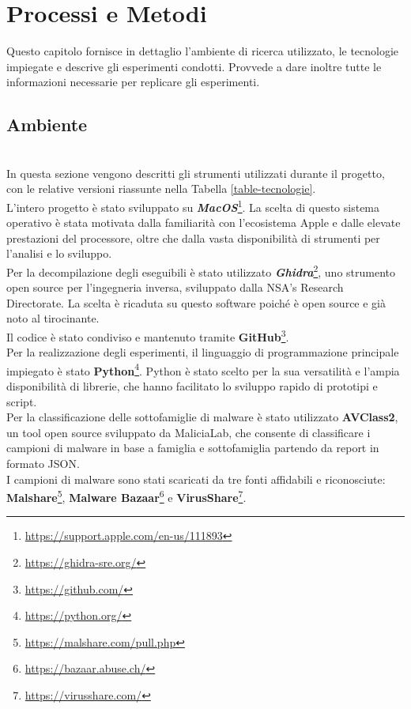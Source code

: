 \chapter{Processi e Metodi}
\label{cap:processi-metodologie}

\indent Questo capitolo fornisce in dettaglio l'ambiente di ricerca utilizzato, le tecnologie impiegate e descrive gli esperimenti condotti. 
Provvede a dare inoltre tutte le informazioni necessarie per replicare gli esperimenti.

\section{Ambiente}  
~\\  
\indent In questa sezione vengono descritti gli strumenti utilizzati durante il progetto, con le relative versioni riassunte nella Tabella \ref{table-tecnologie}.  
\\  
L'intero progetto è stato sviluppato su \textbf{\emph{MacOS}}\footnote{\url{https://support.apple.com/en-us/111893}}. La scelta di questo sistema operativo è stata motivata dalla familiarità con l'ecosistema Apple e dalle elevate prestazioni del processore, oltre che dalla vasta disponibilità di strumenti per l'analisi e lo sviluppo.  
\\  
Per la decompilazione degli eseguibili è stato utilizzato \textbf{\emph{Ghidra}}\footnote{\url{https://ghidra-sre.org/}}, uno strumento open source per l'ingegneria inversa, sviluppato dalla NSA's Research Directorate. La scelta è ricaduta su questo software poiché è open source e già noto al tirocinante.  
\\  
Il codice è stato condiviso e mantenuto tramite \textbf{GitHub}\footnote{\url{https://github.com/}}.  
\\  
Per la realizzazione degli esperimenti, il linguaggio di programmazione principale impiegato è stato \textbf{Python}\footnote{\url{https://python.org/}}. Python è stato scelto per la sua versatilità e l'ampia disponibilità di librerie, che hanno facilitato lo sviluppo rapido di prototipi e script.  
\\  
Per la classificazione delle sottofamiglie di malware è stato utilizzato \textbf{AVClass2}\cite{site:avclass}, un tool open source sviluppato da MaliciaLab, che consente di classificare i campioni di malware in base a famiglia e sottofamiglia partendo da report in formato JSON.  
\\  
I campioni di malware sono stati scaricati da tre fonti affidabili e riconosciute: \textbf{Malshare}\footnote{\url{https://malshare.com/pull.php}}, \textbf{Malware Bazaar}\footnote{\url{https://bazaar.abuse.ch/}} e \textbf{VirusShare}\footnote{\url{https://virusshare.com/}}.  
